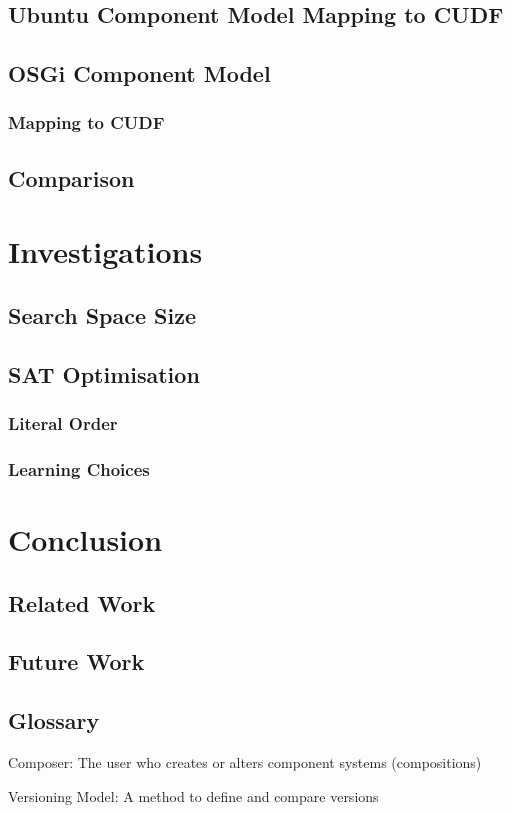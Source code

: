 \documentclass{report}
\begin{document}
\section{Ubuntu Component Model Mapping to CUDF}

\section{OSGi Component Model}
\subsection{Mapping to CUDF}

\section{Comparison}

\chapter{Investigations}

\section{Search Space Size}

\section{SAT Optimisation}
\subsection{Literal Order}
\subsection{Learning Choices}




\chapter{Conclusion}
\section{Related Work}
\section{Future Work}

\section{Glossary}
Composer: The user who creates or alters component systems (compositions)

Versioning Model: A method to define and compare versions
\end{document}
